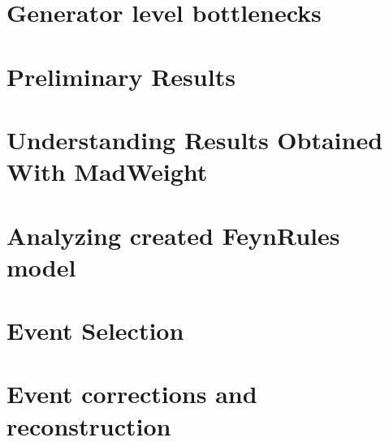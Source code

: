 \documentclass[a4paper,12pt]{report}
\begin{document}
\chapter{Generator level bottlenecks}


\chapter{Preliminary Results}
%

\chapter{Understanding Results Obtained With MadWeight}
%

\chapter{Analyzing created FeynRules model}
%

\chapter{Event Selection}
%

\chapter{Event corrections and reconstruction}
%
\end{document}
